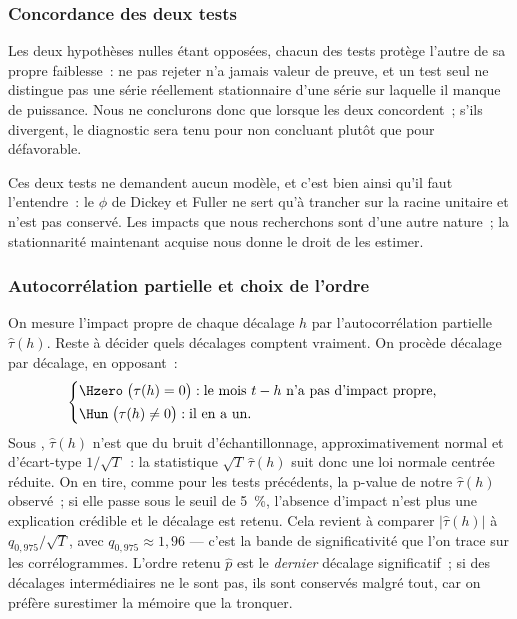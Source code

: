 \subsubsection*{Concordance des deux tests}

Les deux hypothèses nulles étant opposées, chacun des tests protège l'autre de
sa propre faiblesse~: ne pas rejeter n'a jamais valeur de preuve, et un test
seul ne distingue pas une série réellement stationnaire d'une série sur
laquelle il manque de puissance. Nous ne conclurons donc que lorsque les deux
concordent~; s'ils divergent, le diagnostic sera tenu pour non concluant
plutôt que pour défavorable.

Ces deux tests ne demandent aucun modèle, et c'est bien ainsi qu'il faut
l'entendre~: le \(\phi\) de Dickey et Fuller ne sert qu'à trancher sur la
racine unitaire et n'est pas conservé. Les impacts que nous recherchons sont
d'une autre nature~; la stationnarité maintenant acquise nous donne le droit
de les estimer.

\subsubsection*{Autocorrélation partielle et choix de l'ordre}

On mesure l'impact propre de chaque décalage \(h\) par l'autocorrélation
partielle \(\hat\tau(h)\). Reste à décider quels décalages comptent vraiment.
On procède décalage par décalage, en opposant~:
\[
  \begin{cases}
    \Hzero \;\bigl(\tau(h) = 0\bigr) : \text{le mois } t-h \text{ n'a pas d'impact propre,}\\[2pt]
    \Hun \;\bigl(\tau(h) \neq 0\bigr) : \text{il en a un.}
  \end{cases}
\]
Sous \Hzero{}, \(\hat\tau(h)\) n'est que du bruit d'échantillonnage,
approximativement normal et d'écart-type \(1/\sqrt{T}\)~: la statistique
\(\sqrt{T}\,\hat\tau(h)\) suit donc une loi normale centrée réduite. On en
tire, comme pour les tests précédents, la p-value de notre \(\hat\tau(h)\)
observé~; si elle passe sous le seuil de 5~\%, l'absence d'impact n'est plus
une explication crédible et le décalage est retenu. Cela revient à comparer
\(\bigl|\hat\tau(h)\bigr|\) à \(q_{0{,}975}/\sqrt{T}\), avec
\(q_{0{,}975} \approx 1{,}96\) — c'est la bande de significativité que l'on
trace sur les corrélogrammes.
L'ordre retenu \(\hat p\) est le \emph{dernier} décalage significatif~; si
des décalages intermédiaires ne le sont pas, ils sont conservés
malgré tout, car on préfère surestimer la mémoire que la tronquer.


